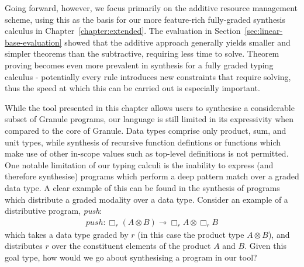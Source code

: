 Going forward, however, we focus primarily on the additive resource management
scheme, using this as the basis for our more feature-rich fully-graded synthesis
calculus in Chapter~\ref{chapter:extended}.  
The evaluation in Section~\ref{sec:linear-base-evaluation} showed that the
additive approach generally yields smaller and simpler theorems than the
subtractive, requiring less time to solve. Theorem proving becomes even more
prevalent in synthesis for a fully graded typing calculus - potentially every
rule introduces new constraints that require solving, thus the speed at which
this can be carried out is especially important.

While the tool presented in this chapter allows users to synthesise a
considerable subset of Granule programs, our language is still limited in its
expressivity when compared to the core of Granule. Data types comprise only
product, sum, and unit types, while synthesis of recursive function defintions
or functions which make use of other in-scope values such as top-level
definitions is not permitted. One notable limitation of our typing calculi is
the inability to express (and therefore synthesise) programs which perform a
deep pattern match over a graded data type. A clear example of this can be found
in the synthesis of programs which distribute a graded modality over a data
type. Consider an example of a distributive program, \textit{push}:
\begin{align*}
  push: \Box_r(A \otimes B) \multimap \Box_r A \otimes \Box_r B
\end{align*}
which takes a data type graded by $r$ (in this case the product type $A \otimes
B$), and distributes $r$ over the constituent elements of the product
$A$ and $B$. Given this goal type, how would we go about synthesising a program
in our tool? 

